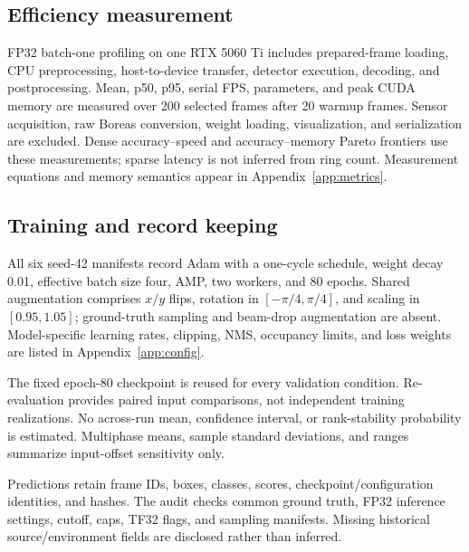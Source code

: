 \documentclass[10pt,twocolumn]{article}
\begin{document}
\subsection{Efficiency measurement}
FP32 batch-one profiling on one RTX 5060 Ti includes prepared-frame loading, CPU preprocessing, host-to-device transfer, detector execution, decoding, and postprocessing. Mean, p50, p95, serial FPS, parameters, and peak CUDA memory are measured over 200 selected frames after 20 warmup frames. Sensor acquisition, raw Boreas conversion, weight loading, visualization, and serialization are excluded. Dense accuracy--speed and accuracy--memory Pareto frontiers use these measurements; sparse latency is not inferred from ring count. Measurement equations and memory semantics appear in Appendix~\ref{app:metrics}.

\subsection{Training and record keeping}
All six seed-42 manifests record Adam with a one-cycle schedule, weight decay 0.01, effective batch size four, AMP, two workers, and 80 epochs. Shared augmentation comprises $x/y$ flips, rotation in $[-\pi/4,\pi/4]$, and scaling in $[0.95,1.05]$; ground-truth sampling and beam-drop augmentation are absent. Model-specific learning rates, clipping, NMS, occupancy limits, and loss weights are listed in Appendix~\ref{app:config}.

The fixed epoch-80 checkpoint is reused for every validation condition. Re-evaluation provides paired input comparisons, not independent training realizations. No across-run mean, confidence interval, or rank-stability probability is estimated. Multiphase means, sample standard deviations, and ranges summarize input-offset sensitivity only.

Predictions retain frame IDs, boxes, classes, scores, checkpoint/configuration identities, and hashes. The audit checks common ground truth, FP32 inference settings, cutoff, caps, TF32 flags, and sampling manifests. Missing historical source/environment fields are disclosed rather than inferred.
\end{document}
